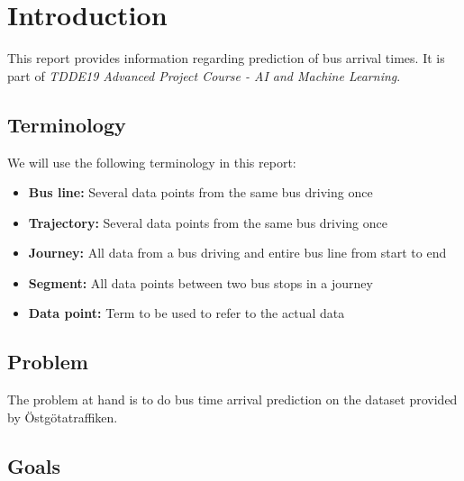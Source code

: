 


\chapter{Introduction}
\label{cha:introduction}

This report provides information regarding prediction of bus arrival times. It is part of \textit{TDDE19 Advanced Project Course - AI and Machine Learning}.

\section{Terminology}
\label{sec:terminology}
We will use the following terminology in this report:
\begin{itemize}
\item \textbf{Bus line:} Several data points from the same bus driving once
\item \textbf{Trajectory:} Several data points from the same bus driving once
\item \textbf{Journey:} All data from a bus driving and entire bus line from start to end
\item \textbf{Segment:} All data points between two bus stops in a journey
\item \textbf{Data point:} Term to be used to refer to the actual data

\end{itemize}
\section{Problem}
\label{sec:problem}

The problem at hand is to do bus time arrival prediction on the dataset provided by \"Ostg\"otatraffiken.

\section{Goals}
\label{sec:aim}

